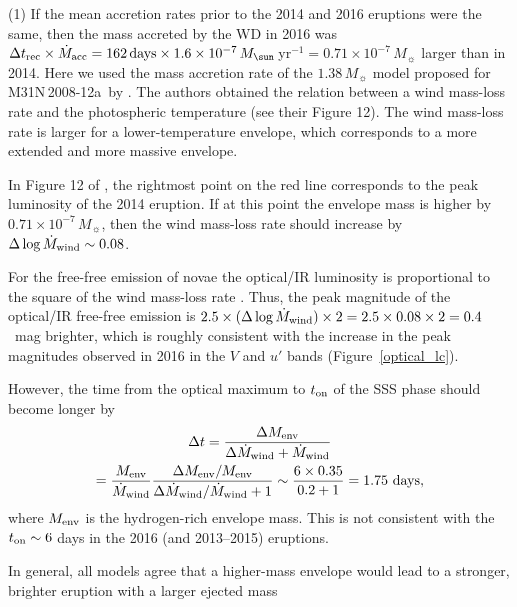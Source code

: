 \documentclass[twocolumn,tighten]{aastex6}
\def\nova{{M31N\,2008-12a~}}
\begin{document}
(1) If the mean accretion rates prior to the 2014 and 2016 eruptions were the same, then the mass accreted by the WD in 2016 was $\Delta t_{\rm rec}\times \dot M_{\rm acc} = 162\,{\rm days} \times 1.6 \times 10^{-7}\,M_\sun$\,yr$^{-1} = 0.71\times10^{-7}\,M_\sun$ larger than in 2014. Here we used the mass accretion rate of the $1.38\,M_\sun$ model proposed for \nova by \citet{2017ApJ...838..153K}. The authors obtained the relation between a wind mass-loss rate and the photospheric temperature (see their Figure 12). The wind mass-loss rate is larger for a lower-temperature envelope, which corresponds to a more extended and more massive envelope. 

In Figure 12 of \citet{2017ApJ...838..153K}, the rightmost point on the red line corresponds to the peak luminosity of the 2014 eruption. If at this point the envelope mass is higher by $0.71\times 10^{-7}\,M_\sun$, then the wind mass-loss rate should increase by $\Delta \log \dot M_{\rm wind} \sim 0.08$. 
 
For the free-free emission of novae the optical/IR luminosity is proportional to the square of the wind mass-loss rate \citep[see e.g.][]{2006ApJS..167...59H}. Thus, the peak magnitude of the optical/IR free-free emission is $2.5 \times (\Delta \log \dot M_{\rm wind}) \times 2 = 2.5 \times 0.08 \times 2 = 0.4$~mag brighter, which is roughly consistent with the increase in the peak magnitudes observed in 2016 in the $V$ and $u'$ bands (Figure~\ref{optical_lc}).

However, the time from the optical maximum to $t_{\rm on}$ of the SSS phase should become longer by 
\begin{multline*}
\Delta t = \frac{\Delta M_{\rm env}} { \Delta \dot M_{\rm wind} + \dot M_{\rm wind}}\\
= \frac{M_{\rm env}}{\dot M_{\rm wind}} \frac{\Delta M_{\rm env}/M_{\rm env}}{\Delta \dot M_{\rm wind}/ \dot M_{\rm wind} + 1} \sim \frac{6 \times 0.35}{0.2+1}=1.75 \text{ days},
\end{multline*}
\noindent where $M_{\rm env}$ is the hydrogen-rich envelope mass. This is not consistent with the $t_{\rm on}\sim6$ days in the 2016 (and 2013--2015) eruptions.

In general, all models agree that a higher-mass envelope would lead to a stronger, brighter eruption with a larger ejected mass \citep[e.g.][]{1998MNRAS.296..502S,2005ApJ...623..398Y, 2006ApJS..167...59H, 2013ApJ...777..136W}
\end{document}
